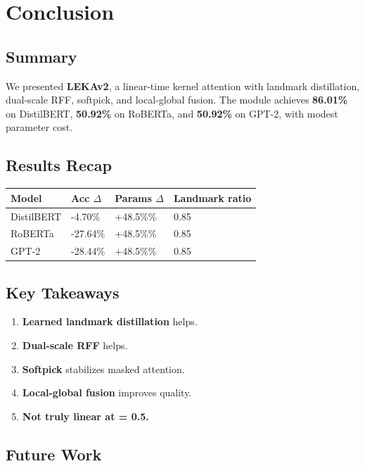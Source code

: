 \section{Conclusion}

\subsection{Summary}

We presented \textbf{LEKAv2}, a linear-time kernel attention with landmark 
distillation, dual-scale RFF, softpick, and local-global fusion. The 
module achieves \textbf{86.01\%} on DistilBERT, \textbf{50.92\%} on RoBERTa, 
and \textbf{50.92\%} on GPT-2, with modest parameter cost.

\subsection{Results Recap}

\begin{table}[H]
\centering
\small
\begin{tabular}{llll}
\toprule
\textbf{Model} & \textbf{Acc $\Delta$} & \textbf{Params $\Delta$} & \textbf{Landmark ratio} \\
\midrule
DistilBERT & -4.70\% & +48.5\%\% & 0.85 \\
RoBERTa & -27.64\% & +48.5\%\% & 0.85 \\
GPT-2 & -28.44\% & +48.5\%\% & 0.85 \\
\bottomrule
\end{tabular}
\end{table}

\subsection{Key Takeaways}

\begin{enumerate}
\item \textbf{Learned landmark distillation} helps.
\item \textbf{Dual-scale RFF} helps.
\item \textbf{Softpick} stabilizes masked attention.
\item \textbf{Local-global fusion} improves quality.
\item \textbf{Not truly linear at   = 0.5.}

\end{enumerate}
\subsection{Future Work}

